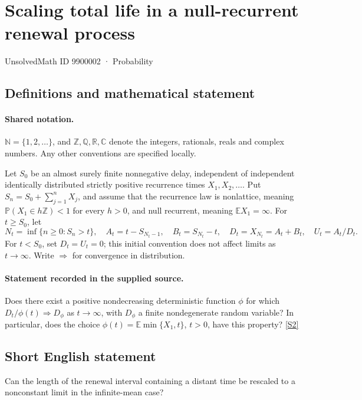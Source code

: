 \documentclass[11pt]{article}
\newcommand{\sref}[2]{\hyperlink{source:#1:#2}{[S#2]}}
\begin{document}
\setcounter{section}{9900001}
\section{Scaling total life in a null-recurrent renewal process}\label{9900002}
{\small\sffamily UnsolvedMath ID 9900002 · Probability}
\subsection{Definitions and mathematical statement}

\paragraph{Shared notation.}$\mathbb N=\{1,2,\ldots\}$, and $\mathbb Z,\mathbb Q,\mathbb R,\mathbb C$ denote the integers, rationals, reals and complex numbers. Any other conventions are specified locally.


Let $S_0$ be an almost surely finite nonnegative delay, independent of independent identically distributed strictly positive recurrence times $X_1,X_2,\ldots$. Put $S_n=S_0+\sum_{j=1}^nX_j$, and assume that the recurrence law is nonlattice, meaning $\mathbb P(X_1\in h\mathbb Z)<1$ for every $h>0$, and null recurrent, meaning $\mathbb E X_1=\infty$. For $t\ge S_0$, let
\[N_t=\inf\{n\ge0:S_n>t\},\quad A_t=t-S_{N_t-1},\quad B_t=S_{N_t}-t,\quad D_t=X_{N_t}=A_t+B_t,\quad U_t=A_t/D_t.\]
For $t<S_0$, set $D_t=U_t=0$; this initial convention does not affect limits as $t\to\infty$. Write $\Rightarrow$ for convergence in distribution.
\paragraph{Statement recorded in the supplied source.}
Does there exist a positive nondecreasing deterministic function $\phi$ for which $D_t/\phi(t)\Rightarrow D_\phi$ as $t\to\infty$, with $D_\phi$ a finite nondegenerate random variable? In particular, does the choice $\phi(t)=\mathbb E\min\{X_1,t\}$, $t>0$, have this property? \sref{9900002}{2}
\subsection{Short English statement}
Can the length of the renewal interval containing a distant time be rescaled to a nonconstant limit in the infinite-mean case?
\end{document}
